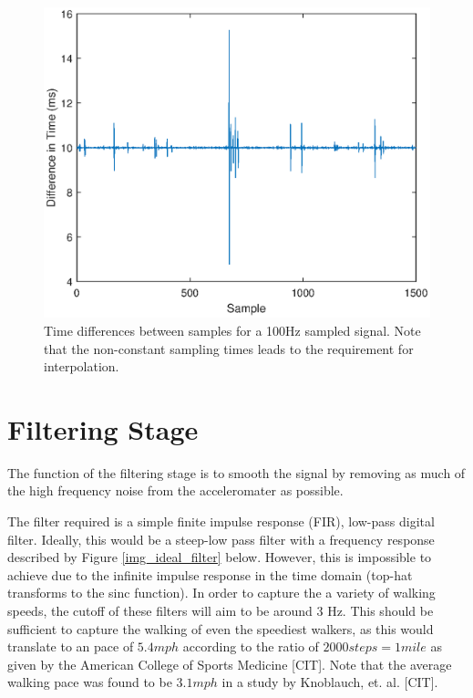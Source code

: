             \begin{figure}[h]
                \includegraphics[width=\textwidth]{Images/sampling_freq.eps}
                \centering
                \caption{Time differences between samples for a 100Hz sampled signal. Note that the non-constant sampling times leads to the requirement for interpolation.}
                \label{img_sampling_freq}
            \end{figure}

        \section{Filtering Stage}

            The function of the filtering stage is to smooth the signal by removing as much of the high frequency noise from the acceleromater as possible.

            The filter required is a simple finite impulse response (FIR), low-pass digital filter. Ideally, this would be a steep-low pass filter with a frequency response described by Figure \ref{img_ideal_filter} below. However, this is impossible to achieve due to the infinite impulse response in the time domain (top-hat transforms to the sinc function). In order to capture the a variety of walking speeds, the cutoff of these filters will aim to be around 3 Hz. This should be sufficient to capture the walking of even the speediest walkers, as this would translate to an pace of $5.4 mph$ according to the ratio of $2000 steps = 1 mile$ as given by the American College of Sports Medicine [CIT]. Note that the average walking pace was found to be $3.1 mph$ in a study by Knoblauch, et. al. [CIT].

